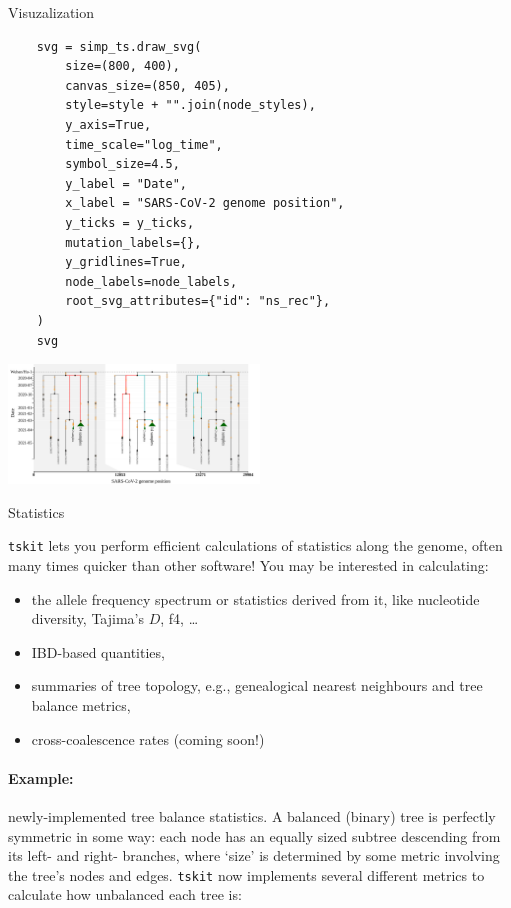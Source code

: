 \documentclass[landscape,a0paper,fontscale=0.5]{baposter}
\newcommand{\tskit}{{\texttt{tskit}}}
\newcommand{\compresslist}{%
 \setlength{\itemsep}{1pt}%
 \setlength{\parskip}{0pt}%
 \setlength{\parsep}{0pt}%
 }
\begin{document}
\begin{poster}
\begin{posterbox}[name=viz,column=1,row=0,span=2,below=overview]{Visuzalization}
\begin{multicols}{2}
\begin{verbatim}
    svg = simp_ts.draw_svg(
        size=(800, 400),
        canvas_size=(850, 405),
        style=style + "".join(node_styles),
        y_axis=True,
        time_scale="log_time",
        symbol_size=4.5,
        y_label = "Date",
        x_label = "SARS-CoV-2 genome position",
        y_ticks = y_ticks,
        mutation_labels={},
        y_gridlines=True,
        node_labels=node_labels,
        root_svg_attributes={"id": "ns_rec"},
    )
    svg
\end{verbatim}

\includegraphics[width=0.5\textwidth]{Covid_recombination}

\end{multicols}

\end{posterbox}



\begin{posterbox}[name=stats,column=3,row=0,span=1]{Statistics}

\tskit{} lets you perform efficient calculations of statistics along the genome, often many times quicker than other software! You may be interested in calculating:

\begin{itemize} \compresslist
    \item the allele frequency spectrum or statistics derived from it,
        like nucleotide diversity, Tajima's $D$, f4, \ldots
    \item IBD-based quantities,
    \item summaries of tree topology,
        e.g., genealogical nearest neighbours and tree balance metrics,
    \item cross-coalescence rates (coming soon!)
\end{itemize}

\paragraph{Example:} newly-implemented tree balance statistics. A balanced
(binary) tree is perfectly symmetric in some way: each node has an equally
sized subtree descending from its left- and right- branches, where `size'
is determined by some metric involving the tree's nodes and edges. \tskit{}
now implements several different metrics to calculate how unbalanced each
tree is:


\end{posterbox}
\end{poster}
\end{document}
